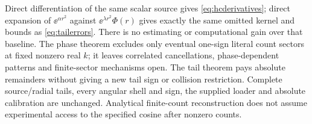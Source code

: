 Direct differentiation of the same scalar source gives
\eqref{eq:hcderivatives}; direct expansion of $\ee^{\alpha r^2}$ against
$\ee^{\lambda r^2}\Phi(r)$ gives exactly the same omitted kernel and
bounds as \eqref{eq:tailerrors}. There is no estimating or computational
gain over that baseline. The phase theorem excludes only eventual one-sign
literal count sectors at fixed nonzero real $k$; it leaves correlated
cancellations, phase-dependent patterns and finite-sector mechanisms open.
The tail theorem pays absolute remainders without giving a new tail sign
or collision restriction. Complete source/radial tails, every angular shell
and sign, the supplied loader and absolute calibration are unchanged.
Analytical finite-count reconstruction does not assume experimental access
to the specified cosine after nonzero counts.

